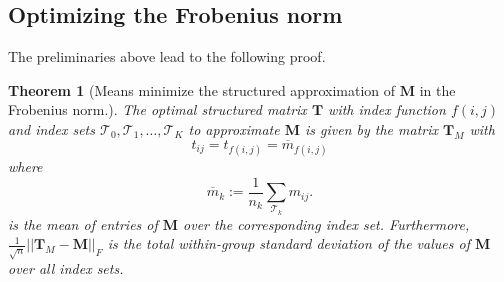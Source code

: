 \documentclass[letterpaper,12pt,oneside,final]{article}
\newtheorem{theorem}{Theorem}
\newcommand{\m}[1]{\mathbf{#1}}               %
\newcommand{\norm}[1]{||{#1}||}              %
\newcommand{\frob}[1]{\norm{#1}_F}
\newcommand{\widebar}[1]{\overline{#1}}
\begin{document}
\subsection{Optimizing the Frobenius norm} \label{sec:approx}

The preliminaries above lead to the following proof.

\begin{theorem}[Means minimize the structured approximation of $\m{M}$ in the Frobenius norm.] \label{thm:genOptimal}
  The optimal structured matrix $\m{T}$ with index function $f(i,j)$ and index sets $\mathcal{T}_0, \mathcal{T}_1, \dots, \mathcal{T}_K$ to approximate $\m{M}$ is given by the matrix $\m{T}_M$ with
  \begin{equation} \label{eq:meanStrucMat}
    t_{ij} = t_{f(i,j)} = \widebar{m}_{f(i,j)}
  \end{equation}
  where
  \begin{equation} \label{eq:strucMeans}
    \widebar{m}_k := \frac{1}{n_k} \sum_{\mathcal{T}_k} m_{ij}.
  \end{equation}
  is the mean of entries of $\m{M}$ over the corresponding index set. Furthermore, $\frac{1}{\sqrt{n}}\frob{\m{T}_M - \m{M}}$ is the total within-group standard deviation of the values of $\m{M}$ over all index sets.
\end{theorem}
\end{document}
